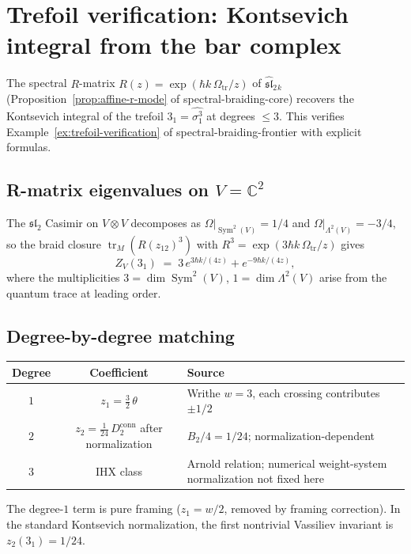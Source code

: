 \documentclass[11pt]{article}
\newcommand{\fsl}{\mathfrak{sl}}
\newcommand{\C}{\mathbb{C}}
\DeclareMathOperator{\Sym}{Sym}
\begin{document}
\section{Trefoil verification: Kontsevich integral from the bar complex}
\label{sec:trefoil-bar-verification}

The spectral $R$-matrix $R(z) = \exp(\hbar k\,\Omega_{\mathrm{tr}}/z)$ of
$\widehat{\fsl}_2{}_k$
(Proposition~\ref{prop:affine-r-mode} of spectral-braiding-core)
recovers the Kontsevich integral of the trefoil $3_1 =
\widehat{\sigma_1^3}$ at degrees $\le 3$.  This verifies
Example~\ref{ex:trefoil-verification} of spectral-braiding-frontier
with explicit formulas.

\subsection*{R-matrix eigenvalues on $V = \C^2$}

The $\fsl_2$ Casimir on $V \otimes V$ decomposes as
$\Omega|_{\Sym^2(V)} = 1/4$ and
$\Omega|_{\Lambda^2(V)} = -3/4$, so the braid closure
$\operatorname{tr}_{M}(R(z_{12})^3)$ with
$R^3 = \exp(3\hbar k\,\Omega_{\mathrm{tr}}/z)$
gives
\[
  Z_V(3_1)
  \;=\;
  3\,e^{3\hbar k/(4z)} + e^{-9\hbar k/(4z)},
\]
where the multiplicities $3 = \dim\Sym^2(V)$,
$1 = \dim\Lambda^2(V)$ arise from the quantum trace at leading
order.

\subsection*{Degree-by-degree matching}

\begin{center}
\renewcommand{\arraystretch}{1.3}
\begin{tabular}{ccl}
\textbf{Degree} & \textbf{Coefficient} & \textbf{Source} \\
\hline
$1$ & $z_1 = \tfrac{3}{2}\,\theta$ &
  Writhe $w = 3$, each crossing contributes $\pm 1/2$ \\
$2$ & $z_2 = \tfrac{1}{24}\,D_2^{\mathrm{conn}}$ after normalization &
  $B_2/4 = 1/24$; normalization-dependent \\
$3$ & IHX class &
  Arnold relation; numerical weight-system normalization not fixed here
\end{tabular}
\end{center}

\noindent
The degree-$1$ term is pure framing ($z_1 = w/2$, removed by
framing correction).  In the standard Kontsevich normalization,
the first nontrivial Vassiliev invariant is $z_2(3_1) = 1/24$.
\end{document}
